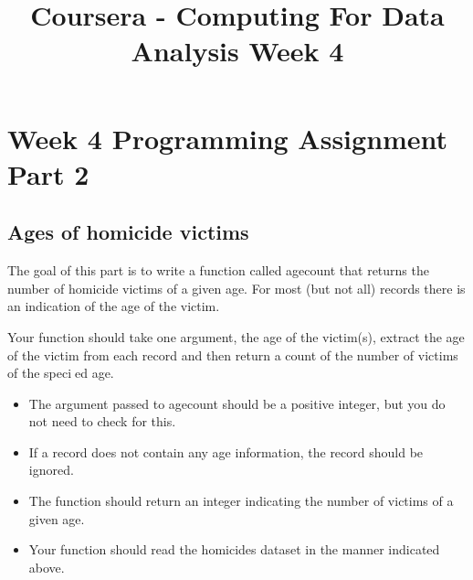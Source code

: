 \documentclass[]{article}
\title{Coursera - Computing For Data Analysis Week 4}
\begin{document}
\maketitle



\section{Week 4 Programming Assignment Part 2}

\subsection{Ages of homicide victims}

The goal of this part is to write a function called agecount that returns the number of
homicide victims of a given age. For most (but not all) records there is an indication of the
age of the victim.

\bigskip
\noindent
Your function should take one argument, the age of the victim(s), extract
the age of the victim from each record and then return a count of the number of victims of
the specied age.
\begin{itemize}
\item The argument passed to agecount should be a positive integer, but you do not need
to check for this.
\item If a record does not contain any age information, the record should be ignored.
\item The function should return an integer indicating the number of victims of a given age.
\item Your function should read the homicides dataset in the manner indicated above.
\end{itemize}
\end{document}
